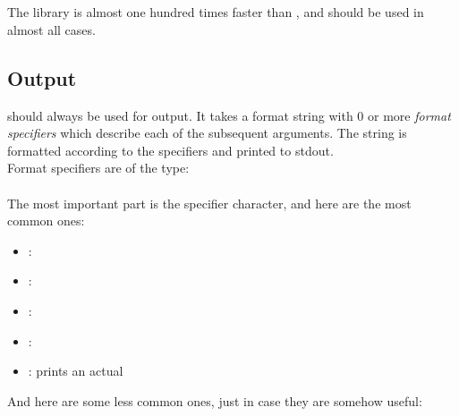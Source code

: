 \documentclass[../main]{subfiles}
\begin{document}
    \section{}

        The  library is almost one hundred times faster than , and should be used in almost all cases.

        \subsection{Output}

             should always be used for output. It takes a format string with 0 or more \textit{format specifiers} which describe each of the subsequent arguments. The string is formatted according to the specifiers and printed to stdout.\\

            Format specifiers are of the type:\\
            \\
            
            The most important part is the specifier character, and here are the most common ones:

            \begin{itemize}
                \item {}: 
                \item {}: 
                \item {}: 
                \item {}: 
                \item \code{\%}: prints an actual \code{\%} 
            \end{itemize}

            And here are some less common ones, just in case they are somehow useful:
\end{document}
